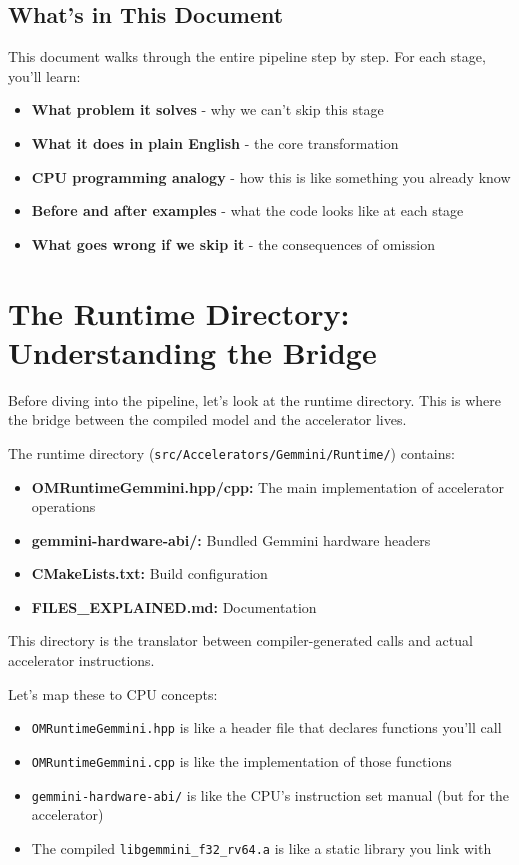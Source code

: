 \documentclass[12pt,a4paper]{article}
\begin{document}
\subsection{What's in This Document}

This document walks through the entire pipeline step by step. For each stage, you'll learn:
\begin{itemize}[leftmargin=*]
  \item \textbf{What problem it solves} - why we can't skip this stage
  \item \textbf{What it does in plain English} - the core transformation
  \item \textbf{CPU programming analogy} - how this is like something you already know
  \item \textbf{Before and after examples} - what the code looks like at each stage
  \item \textbf{What goes wrong if we skip it} - the consequences of omission
\end{itemize}

\section{The Runtime Directory: Understanding the Bridge}

Before diving into the pipeline, let's look at the runtime directory. This is where the bridge between the compiled model and the accelerator lives.

\begin{infoboxenv}
The runtime directory (\texttt{src/Accelerators/Gemmini/Runtime/}) contains:
\begin{itemize}
  \item \textbf{OMRuntimeGemmini.hpp/cpp:} The main implementation of accelerator operations
  \item \textbf{gemmini-hardware-abi/:} Bundled Gemmini hardware headers
  \item \textbf{CMakeLists.txt:} Build configuration
  \item \textbf{FILES\_EXPLAINED.md:} Documentation
\end{itemize}

This directory is the translator between compiler-generated calls and actual accelerator instructions.
\end{infoboxenv}

\begin{sidebarbox}
Let's map these to CPU concepts:
\begin{itemize}
  \item \texttt{OMRuntimeGemmini.hpp} is like a header file that declares functions you'll call
  \item \texttt{OMRuntimeGemmini.cpp} is like the implementation of those functions
  \item \texttt{gemmini-hardware-abi/} is like the CPU's instruction set manual (but for the accelerator)
  \item The compiled \texttt{libgemmini\_f32\_rv64.a} is like a static library you link with
\end{itemize}
\end{sidebarbox}
\end{document}
